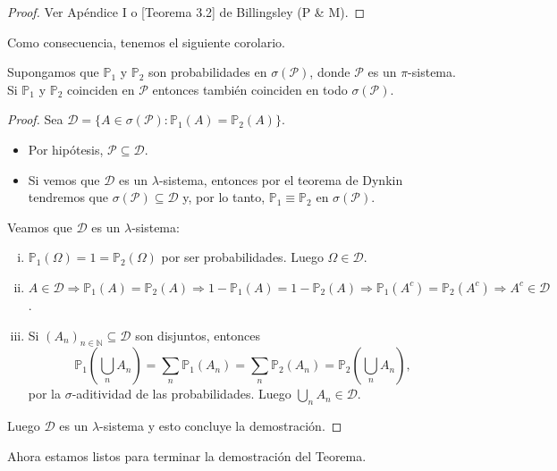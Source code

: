 \begin{proof}
	Ver Apéndice I o [Teorema 3.2] de Billingsley (P \& M).
\end{proof}
\medskip \par
Como consecuencia, tenemos el siguiente corolario.

\begin{corollary}
    Supongamos que \(\mathbb{P}_1\) y \(\mathbb{P}_2\) son probabilidades en \(\sigma(\mathcal{P})\), donde \(\mathcal{P}\) es un \(\pi\)-sistema. Si \(\mathbb{P}_1\) y \(\mathbb{P}_2\) coinciden en \(\mathcal{P}\) entonces también coinciden en todo \(\sigma(\mathcal{P})\).
\end{corollary}

\begin{proof}
    Sea \(\mathcal{D} = \{ A \in \sigma(\mathcal{P}) : \mathbb{P}_1(A) = \mathbb{P}_2(A) \}\).
    \begin{itemize}
        \item Por hipótesis, \(\mathcal{P} \subseteq \mathcal{D}\).
        \item Si vemos que \(\mathcal{D}\) es un \(\lambda\)-sistema, entonces por el teorema de Dynkin tendremos que \(\sigma(\mathcal{P}) \subseteq \mathcal{D}\) y, por lo tanto, \(\mathbb{P}_1 \equiv \mathbb{P}_2\) en \(\sigma(\mathcal{P})\).
    \end{itemize}
    Veamos que \(\mathcal{D}\) es un \(\lambda\)-sistema:
	\begin{enumerate}[i)]
        \item \(\mathbb{P}_1(\Omega) = 1 = \mathbb{P}_2(\Omega)\) por ser probabilidades. Luego \(\Omega \in \mathcal{D}\).
        \item \(A \in \mathcal{D} \Rightarrow \mathbb{P}_1(A) = \mathbb{P}_2(A) \Rightarrow 1 - \mathbb{P}_1(A) = 1 - \mathbb{P}_2(A) \Rightarrow \mathbb{P}_1(A^c) = \mathbb{P}_2(A^c) \Rightarrow A^c \in \mathcal{D}\).
        \item Si \((A_n)_{n\in\mathbb{N}} \subseteq \mathcal{D}\) son disjuntos, entonces
        \[
        \mathbb{P}_1\!\left(\bigcup_{n} A_n\right) = \sum_{n} \mathbb{P}_1(A_n) = \sum_{n} \mathbb{P}_2(A_n) = \mathbb{P}_2\!\left(\bigcup_{n} A_n\right),
        \]
        por la \(\sigma\)-aditividad de las probabilidades. Luego \(\bigcup_n A_n \in \mathcal{D}\).
    \end{enumerate}
    Luego \(\mathcal{D}\) es un \(\lambda\)-sistema y esto concluye la demostración.
\end{proof}
\medskip \par
Ahora estamos listos para terminar la demostración del Teorema.

